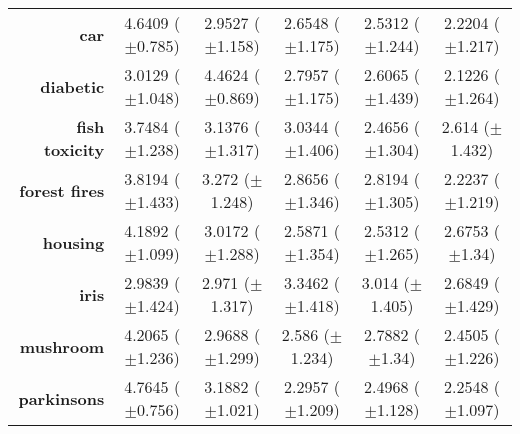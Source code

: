 \begin{table}[htbp]
{\begin{tabular}{r|ccccc}
			\textbf{car}                 & \cellcolor[rgb]{ .973,  .412,  .42}4.6409 ($\pm$0.785)  & \cellcolor[rgb]{ .996,  .847,  .506}2.9527 ($\pm$1.158) & \cellcolor[rgb]{ 1,  .922,  .518}2.6548 ($\pm$1.175)    & \cellcolor[rgb]{ .824,  .871,  .506}2.5312 ($\pm$1.244) & \cellcolor[rgb]{ .388,  .745,  .482}2.2204 ($\pm$1.217) \\
			\textbf{diabetic}            & \cellcolor[rgb]{ 1,  .859,  .506}3.0129 ($\pm$1.048)    & \cellcolor[rgb]{ .973,  .412,  .42}4.4624 ($\pm$0.869)  & \cellcolor[rgb]{ 1,  .922,  .518}2.7957 ($\pm$1.175)    & \cellcolor[rgb]{ .827,  .871,  .506}2.6065 ($\pm$1.439) & \cellcolor[rgb]{ .388,  .745,  .482}2.1226 ($\pm$1.264) \\
			\textbf{fish toxicity}       & \cellcolor[rgb]{ .973,  .412,  .42}3.7484 ($\pm$1.238)  & \cellcolor[rgb]{ .996,  .851,  .506}3.1376 ($\pm$1.317) & \cellcolor[rgb]{ 1,  .922,  .518}3.0344 ($\pm$1.406)    & \cellcolor[rgb]{ .388,  .745,  .482}2.4656 ($\pm$1.304) & \cellcolor[rgb]{ .545,  .788,  .49}2.614 ($\pm$1.432)   \\
			\textbf{forest fires}        & \cellcolor[rgb]{ .973,  .412,  .42}3.8194 ($\pm$1.433)  & \cellcolor[rgb]{ .992,  .706,  .478}3.272 ($\pm$1.248)  & \cellcolor[rgb]{ 1,  .922,  .518}2.8656 ($\pm$1.346)    & \cellcolor[rgb]{ .953,  .906,  .514}2.8194 ($\pm$1.305) & \cellcolor[rgb]{ .388,  .745,  .482}2.2237 ($\pm$1.219) \\
			\textbf{housing}             & \cellcolor[rgb]{ .973,  .412,  .42}4.1892 ($\pm$1.099)  & \cellcolor[rgb]{ .996,  .808,  .498}3.0172 ($\pm$1.288) & \cellcolor[rgb]{ .624,  .812,  .494}2.5871 ($\pm$1.354) & \cellcolor[rgb]{ .388,  .745,  .482}2.5312 ($\pm$1.265) & \cellcolor[rgb]{ 1,  .922,  .518}2.6753 ($\pm$1.34)     \\
			\textbf{iris}                & \cellcolor[rgb]{ 1,  .922,  .518}2.9839 ($\pm$1.424)    & \cellcolor[rgb]{ .973,  .914,  .514}2.971 ($\pm$1.317)  & \cellcolor[rgb]{ .973,  .412,  .42}3.3462 ($\pm$1.418)  & \cellcolor[rgb]{ 1,  .882,  .51}3.014 ($\pm$1.405)      & \cellcolor[rgb]{ .388,  .745,  .482}2.6849 ($\pm$1.429) \\
			\textbf{mushroom}            & \cellcolor[rgb]{ .973,  .412,  .42}4.2065 ($\pm$1.236)  & \cellcolor[rgb]{ 1,  .859,  .506}2.9688 ($\pm$1.299)    & \cellcolor[rgb]{ .631,  .816,  .494}2.586 ($\pm$1.234)  & \cellcolor[rgb]{ 1,  .922,  .518}2.7882 ($\pm$1.34)     & \cellcolor[rgb]{ .388,  .745,  .482}2.4505 ($\pm$1.226) \\
			\textbf{parkinsons}          & \cellcolor[rgb]{ .973,  .412,  .42}4.7645 ($\pm$0.756)  & \cellcolor[rgb]{ .992,  .769,  .49}3.1882 ($\pm$1.021)  & \cellcolor[rgb]{ .49,  .773,  .486}2.2957 ($\pm$1.209)  & \cellcolor[rgb]{ 1,  .922,  .518}2.4968 ($\pm$1.128)    & \cellcolor[rgb]{ .388,  .745,  .482}2.2548 ($\pm$1.097) \\

\end{tabular}}
\end{table}
